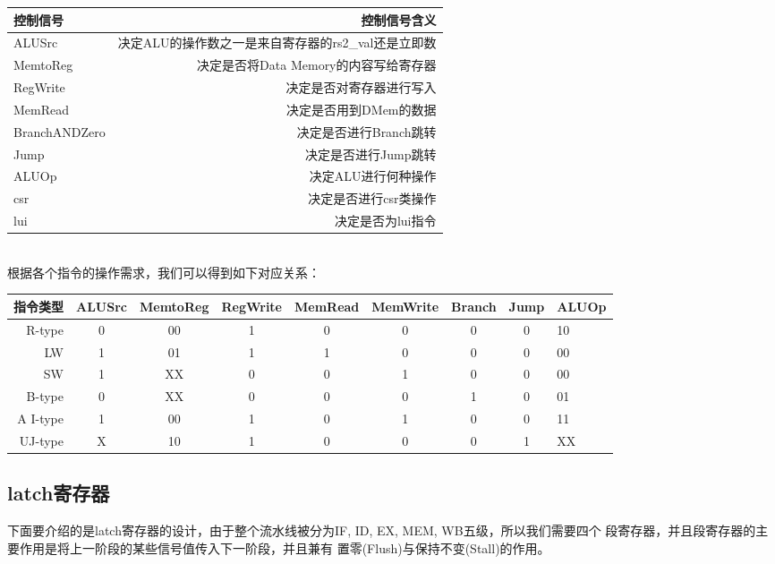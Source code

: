 \begin{tabular}{|l|r|}
    \hline
    控制信号 & 控制信号含义 \\
    \hline
    ALUSrc & 决定ALU的操作数之一是来自寄存器的rs2\_val还是立即数 \\
    \hline
    MemtoReg & 决定是否将Data Memory的内容写给寄存器 \\
    \hline
    RegWrite & 决定是否对寄存器进行写入 \\
    \hline
    MemRead & 决定是否用到DMem的数据 \\
    \hline
    BranchANDZero & 决定是否进行Branch跳转 \\
    \hline
    Jump & 决定是否进行Jump跳转 \\
    \hline
    ALUOp & 决定ALU进行何种操作 \\
    \hline
    csr & 决定是否进行csr类操作 \\
    \hline
    lui & 决定是否为lui指令 \\
    \hline
\end{tabular} \\

根据各个指令的操作需求，我们可以得到如下对应关系：\\

\scalebox{0.9}
{
\begin{tabular}{|r|c|c|c|c|c|c|c|l|}
    \hline
    指令类型      & ALUSrc & MemtoReg & RegWrite & MemRead & MemWrite & Branch & Jump & ALUOp \\
    \hline
    R-type       & 0 & 00 & 1 & 0 & 0 & 0 & 0 & 10 \\
    \hline
    LW           & 1 & 01 & 1 & 1 & 0 & 0 & 0 & 00 \\
    \hline
    SW           & 1 & XX & 0 & 0 & 1 & 0 & 0 & 00 \\
    \hline
    B-type       & 0 & XX & 0 & 0 & 0 & 1 & 0 & 01 \\
    \hline
    A I-type     & 1 & 00 & 1 & 0 & 1 & 0 & 0 & 11 \\ %
    \hline
    UJ-type      & X & 10 & 1 & 0 & 0 & 0 & 1 & XX \\
    \hline  
\end{tabular} 
}

\subsection{latch寄存器}
下面要介绍的是latch寄存器的设计，由于整个流水线被分为IF, ID, EX, MEM, WB五级，所以我们需要四个
段寄存器，并且段寄存器的主要作用是将上一阶段的某些信号值传入下一阶段，并且兼有
置零(Flush)与保持不变(Stall)的作用。

